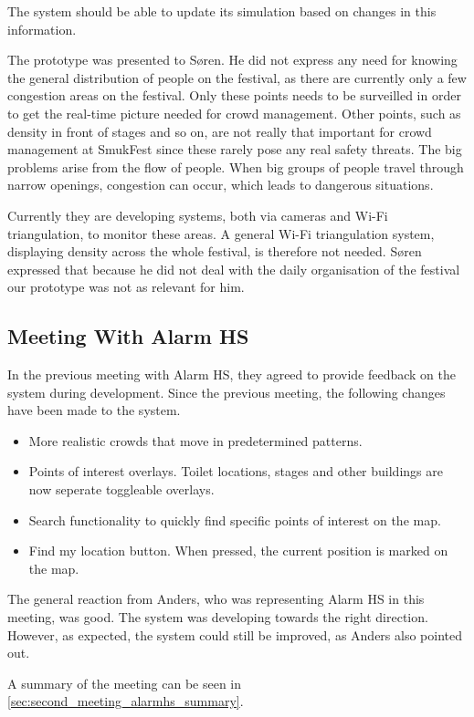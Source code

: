 The system should be able to update its simulation based on changes in this information.

The prototype was presented to Søren. He did not express any need for knowing the general distribution of people on the festival, as there are currently only a few congestion areas on the festival. Only these points needs to be surveilled in order to get the real-time picture needed for crowd management. Other points, such as density in front of stages and so on, are not really that important for crowd management at SmukFest since these rarely pose any real safety threats. The big problems arise from the flow of people. When big groups of people travel through narrow openings, congestion can occur, which leads to dangerous situations.

Currently they are developing systems, both via cameras and Wi-Fi triangulation, to monitor these areas. A general Wi-Fi triangulation system, displaying density across the whole festival, is therefore not needed. Søren expressed that because he did not deal with the daily organisation of the festival our prototype was not as relevant for him.

\subsection{Meeting With Alarm HS}
In the previous meeting with Alarm HS, they agreed to provide feedback on the system during development. Since the previous meeting, the following changes have been made to the system.

\begin{itemize}
    \item More realistic crowds that move in predetermined patterns.
    \item Points of interest overlays. Toilet locations, stages and other buildings are now seperate toggleable overlays.
    \item Search functionality to quickly find specific points of interest on the map.
    \item Find my location button. When pressed, the current position is marked on the map.
\end{itemize}

The general reaction from Anders, who was representing Alarm HS in this meeting, was good. The system was developing towards the right direction. However, as expected, the system could still be improved, as Anders also pointed out.

A summary of the meeting can be seen in \cref{sec:second_meeting_alarmhs_summary}.